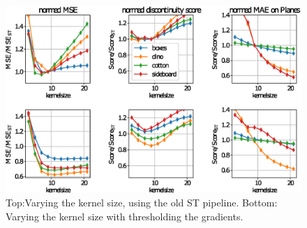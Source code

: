 \documentclass  [
  paper    = a4,
  BCOR     = 10mm,
  twoside,
  fontsize = 12pt,
  fleqn,
  toc      = bibnumbered,
  toc      = listofnumbered,
  numbers  = noendperiod,
  headings = normal,
  listof   = leveldown,
  version  = 3.03
]                                       {scrreprt}
\begin{document}
\begin{figure}[h!]
	\centering
	\includegraphics[width=1\linewidth]{images/old_outer}
	\caption[Varying kernel size]{Top:Varying the kernel size, using the old ST pipeline. Bottom: Varying the kernel size with thresholding the gradients.}
	\label{fig:oldouter}
\end{figure}
\end{document}
